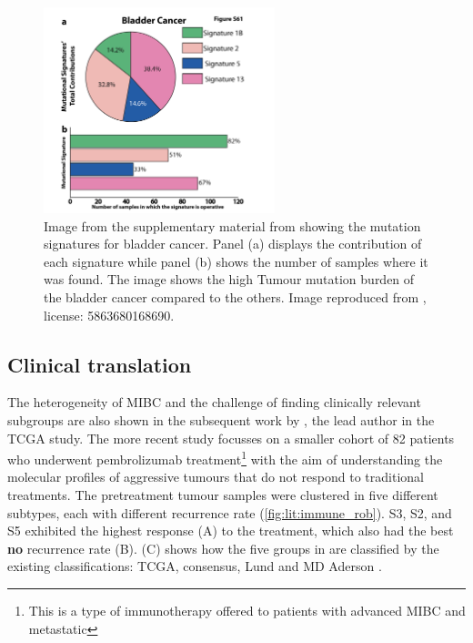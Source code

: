 \begin{figure}[!htb]    
    \centering
    \includegraphics[width=0.6\textwidth,height=0.6\textheight,keepaspectratio]{Sections/Lit_review/Resources/bladder_mut_sig.png}
    \caption[Bladder mutational signature]{Image from the supplementary material from \citeauthor{Alexandrov2013-gi} showing the mutation signatures for bladder cancer. Panel (a) displays the contribution of each signature while panel (b) shows the number of samples where it was found. The image shows the high Tumour mutation burden of the bladder cancer compared to the others. Image reproduced from \citep{Alexandrov2013-gi}, license: 5863680168690. }
    \label{fig:lit:bladder_mut_sig}
\end{figure}



\subsection{Clinical translation} \label{s:lit:clinical}


The heterogeneity of MIBC and the challenge of finding clinically relevant subgroups are also shown in the subsequent work by \citeauthor{Robertson2023-na}, the lead author in the TCGA study. The more recent study focusses on a smaller cohort of 82 patients who underwent pembrolizumab treatment\footnote{This is a type of immunotherapy offered to patients with advanced MIBC and metastatic} with the aim of understanding the molecular profiles of aggressive tumours that do not respond to traditional treatments. The pretreatment tumour samples were clustered in five different subtypes, each with different recurrence rate (\cref{fig:lit:immune_rob}). S3, S2, and S5 exhibited the highest response (A) to the treatment, which also had the best \textbf{no} recurrence rate (B).  (C) shows how the five groups in \cite{Robertson2023-na} are classified by the existing classifications: TCGA, consensus, Lund and MD Aderson \citep{Robertson2017-mg,Kamoun2020-tj,Marzouka2018-ge,Dadhania2016-cb}. 

